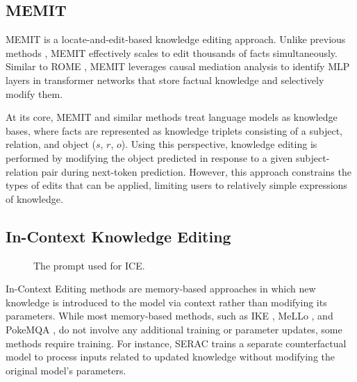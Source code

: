 \subsection{MEMIT}

MEMIT \citep{meng2023memit} is a locate-and-edit-based knowledge editing approach. Unlike previous methods \citep{Zhu2020ModifyingMI, DeCao2021EditingFK, mitchell2022fast, NEURIPS2023_3927bbdc, Meng2022LocatingAE}, MEMIT effectively scales to edit thousands of facts simultaneously. Similar to ROME \citep{Meng2022LocatingAE}, MEMIT leverages causal mediation analysis \citep{Pearl2001DirectAI, Vig2020InvestigatingGB, Meng2022LocatingAE} to identify MLP layers in transformer networks that store factual knowledge and selectively modify them.

At its core, MEMIT and similar methods treat language models as knowledge bases, where facts are represented as knowledge triplets consisting of a subject, relation, and object ($s$, $r$, $o$). Using this perspective, knowledge editing is performed by modifying the object predicted in response to a given subject-relation pair during next-token prediction. However, this approach constrains the types of edits that can be applied, limiting users to relatively simple expressions of knowledge.
\subsection{In-Context Knowledge Editing}
\label{appendix:ice_details}

\begin{figure}[t]

\caption{The prompt used for ICE.}
\label{fig:ice_prompt}
\end{figure}

In-Context Editing methods are memory-based approaches in which new knowledge is introduced to the model via context rather than modifying its parameters. While most memory-based methods, such as IKE \citep{zheng-etal-2023-edit}, MeLLo \citep{Zhong2023MQuAKEAK}, and PokeMQA \citep{Gu2023PokeMQAPK}, do not involve any additional training or parameter updates, some methods require training. For instance, SERAC \citep{mitchell2022memory} trains a separate counterfactual model to process inputs related to updated knowledge without modifying the original model’s parameters.

